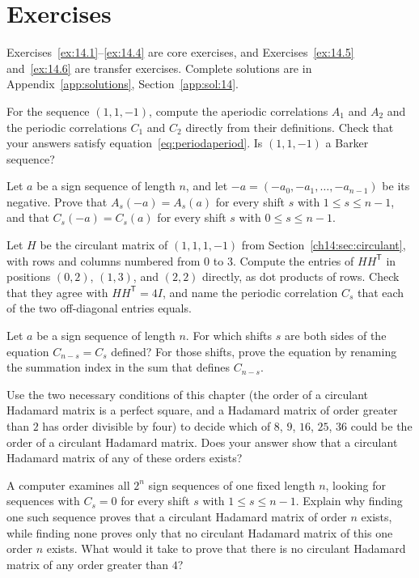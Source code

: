 \section*{Exercises}
Exercises~\ref{ex:14.1}--\ref{ex:14.4} are core exercises, and Exercises~\ref{ex:14.5} and~\ref{ex:14.6} are transfer exercises. Complete solutions are in Appendix~\ref{app:solutions}, Section~\ref{app:sol:14}.
\begin{exercise}\label{ex:14.1}For the sequence $(1,1,-1)$, compute the aperiodic correlations $A_1$ and $A_2$ and the periodic correlations $C_1$ and $C_2$ directly from their definitions. Check that your answers satisfy equation~\eqref{eq:periodaperiod}. Is $(1,1,-1)$ a Barker sequence?\end{exercise}
\begin{exercise}\label{ex:14.2}Let $a$ be a sign sequence of length $n$, and let $-a=(-a_0,-a_1,\ldots,-a_{n-1})$ be its negative. Prove that $A_s(-a)=A_s(a)$ for every shift $s$ with $1\le s\le n-1$, and that $C_s(-a)=C_s(a)$ for every shift $s$ with $0\le s\le n-1$.\end{exercise}
\begin{exercise}\label{ex:14.3}Let $H$ be the circulant matrix of $(1,1,1,-1)$ from Section~\ref{ch14:sec:circulant}, with rows and columns numbered from $0$ to $3$. Compute the entries of $HH^{\mathsf T}$ in positions $(0,2)$, $(1,3)$, and $(2,2)$ directly, as dot products of rows. Check that they agree with $HH^{\mathsf T}=4I$, and name the periodic correlation $C_s$ that each of the two off-diagonal entries equals.\end{exercise}
\begin{exercise}\label{ex:14.4}Let $a$ be a sign sequence of length $n$. For which shifts $s$ are both sides of the equation $C_{n-s}=C_s$ defined? For those shifts, prove the equation by renaming the summation index in the sum that defines $C_{n-s}$.\end{exercise}
\begin{exercise}\label{ex:14.5}Use the two necessary conditions of this chapter (the order of a circulant Hadamard matrix is a perfect square, and a Hadamard matrix of order greater than $2$ has order divisible by four) to decide which of $8$, $9$, $16$, $25$, $36$ could be the order of a circulant Hadamard matrix. Does your answer show that a circulant Hadamard matrix of any of these orders exists?\end{exercise}
\begin{exercise}\label{ex:14.6}A computer examines all $2^n$ sign sequences of one fixed length $n$, looking for sequences with $C_s=0$ for every shift $s$ with $1\le s\le n-1$. Explain why finding one such sequence proves that a circulant Hadamard matrix of order $n$ exists, while finding none proves only that no circulant Hadamard matrix of this one order $n$ exists. What would it take to prove that there is no circulant Hadamard matrix of any order greater than $4$?\end{exercise}
